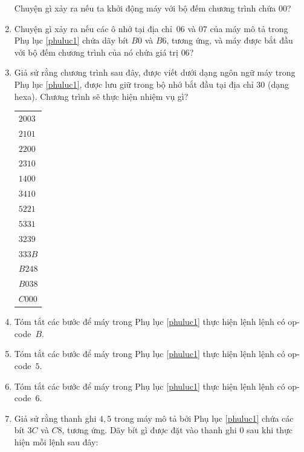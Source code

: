 \begin{multicols}{2}
\begin{enumerate}
    Chuyện gì xảy ra nếu ta khởi động máy với bộ đếm chương trình chứa $00$?

  \item Chuyện gì xảy ra nếu các ô nhớ tại địa chỉ~$06$ và $07$ của máy mô tả trong Phụ
    lục \ref{phuluc1} chứa dãy bít $B0$ và $B6$, tương ứng, và máy được bắt đầu với bộ đếm
    chương trình của nó chứa giá trị $06$?

  \item Giả sử rằng chương trình sau đây, được viết dưới dạng ngôn ngữ máy trong Phụ lục
    \ref{phuluc1}, được lưu giữ trong bộ nhớ bắt đầu tại địa chỉ $30$ (dạng hexa). Chương
    trình sẽ thực hiện nhiệm vụ gì?

    \begin{tabular}{l}
      $2003$ \\  
      $2101$ \\  
      $2200$ \\  
      $2310$ \\  
      $1400$ \\  
      $3410$ \\  
      $5221$ \\  
      $5331$ \\  
      $3239$ \\  
      $333B$ \\  
      $B248$ \\  
      $B038$ \\  
      $C000$
    \end{tabular}

  \item Tóm tắt các bước để máy trong Phụ lục \ref{phuluc1} thực hiện lệnh lệnh có
    op-code~$B$.

  \item Tóm tắt các bước để máy trong Phụ lục \ref{phuluc1} thực hiện lệnh lệnh có
    op-code~$5$.

  \item Tóm tắt các bước để máy trong Phụ lục \ref{phuluc1} thực hiện lệnh lệnh có
    op-code~$6$.
  
  \item Giả sử rằng thanh ghi $4, 5$ trong máy mô tả bởi Phụ lục \ref{phuluc1} chứa các
    bít $3C$ và $C8$, tương ứng. Dãy bít gì được đặt vào thanh ghi $0$ sau khi thực hiện
    mỗi lệnh sau đây:



\end{enumerate}
\end{multicols}
